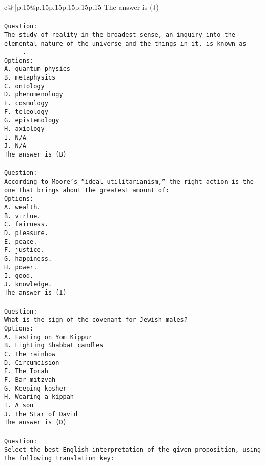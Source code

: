 \documentclass{article}
\begin{document}
{\begin{supertabular}{c@{$\;$}|p{.15\linewidth}@{}p{.15\linewidth}p{.15\linewidth}p{.15\linewidth}p{.15\linewidth}p{.15\linewidth}}
{{{The answer is (J)\\ \tt \\ \tt Question:\\ \tt The study of reality in the broadest sense, an inquiry into the elemental nature of the universe and the things in it, is known as _____.\\ \tt Options:\\ \tt A. quantum physics\\ \tt B. metaphysics\\ \tt C. ontology\\ \tt D. phenomenology\\ \tt E. cosmology\\ \tt F. teleology\\ \tt G. epistemology\\ \tt H. axiology\\ \tt I. N/A\\ \tt J. N/A\\ \tt The answer is (B)\\ \tt \\ \tt Question:\\ \tt According to Moore’s “ideal utilitarianism,” the right action is the one that brings about the greatest amount of:\\ \tt Options:\\ \tt A. wealth.\\ \tt B. virtue.\\ \tt C. fairness.\\ \tt D. pleasure.\\ \tt E. peace.\\ \tt F. justice.\\ \tt G. happiness.\\ \tt H. power.\\ \tt I. good.\\ \tt J. knowledge.\\ \tt The answer is (I)\\ \tt \\ \tt Question:\\ \tt What is the sign of the covenant for Jewish males?\\ \tt Options:\\ \tt A. Fasting on Yom Kippur\\ \tt B. Lighting Shabbat candles\\ \tt C. The rainbow\\ \tt D. Circumcision\\ \tt E. The Torah\\ \tt F. Bar mitzvah\\ \tt G. Keeping kosher\\ \tt H. Wearing a kippah\\ \tt I. A son\\ \tt J. The Star of David\\ \tt The answer is (D)\\ \tt \\ \tt Question:\\ \tt  Select the best English interpretation of the given proposition, using the following translation key: }}}
\end{supertabular}}
\end{document}

